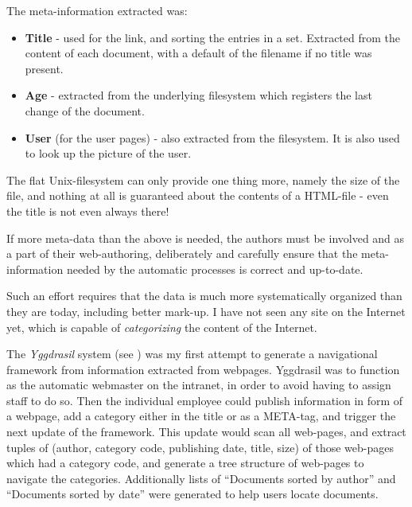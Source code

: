 The meta-information extracted was:

\begin{itemize}
\item \textbf{Title} - used for the link, and sorting the entries in a
  set.  Extracted from the content of each document, with a default of
  the filename if no title was present.
\item \textbf{Age} - extracted from the underlying filesystem which
  registers the last change of the document.
\item \textbf{User} (for the user pages) - also extracted from the
  filesystem.  It is also used to look up the picture of the user.


\end{itemize}

The flat Unix-filesystem can only provide one thing more,
namely the size of the file, and nothing at all is
guaranteed about the contents of a HTML-file - even the
title is not even always there!

If more meta-data than the above is needed, the authors must be
involved and as a part of their web-authoring, deliberately and
carefully ensure that the meta-information needed by the automatic
processes is correct and up-to-date.

Such an effort requires that the data is much more systematically
organized than they are today, including better mark-up.  I have not
seen any site on the Internet yet, which is capable of
\textit{categorizing} the content of the Internet.

The \textit{Yggdrasil} system (see
) was my first attempt to
generate a navigational framework from information extracted
from webpages.  Yggdrasil was to function as the automatic
webmaster on the intranet, in order to avoid having to
assign staff to do so.  Then the individual employee could
publish information in form of a webpage, add a category
either in the title or as a META-tag, and trigger the next
update of the framework.  This update would scan all
web-pages, and extract tuples of (author, category code,
publishing date, title, size) of those web-pages which had a
category code, and generate a tree structure of web-pages to
navigate the categories.  Additionally lists of ``Documents
sorted by author'' and ``Documents sorted by date'' were
generated to help users locate documents.

